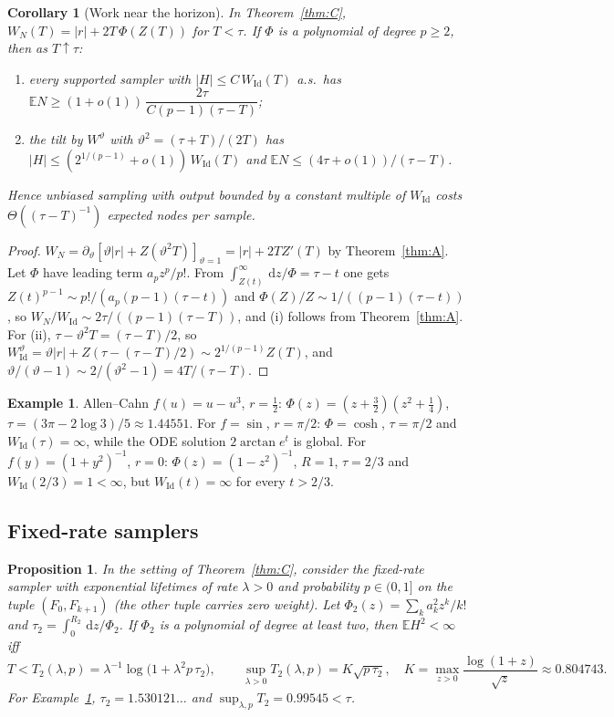\documentclass[11pt]{article}
\newtheorem{proposition}[theorem]{Proposition}
\newtheorem{corollary}[theorem]{Corollary}
\theoremstyle{definition}
\newtheorem{example}[theorem]{Example}
\theoremstyle{remark}
\newcommand{\E}{\mathbb{E}}
\newcommand{\Id}{\mathrm{Id}}
\newcommand{\dd}{\,\mathrm{d}}
\begin{document}
\begin{corollary}[Work near the horizon]\label{cor:work}
In Theorem~\ref{thm:C}, $W_N(T)=|r|+2T\,\Phi(Z(T))$ for $T<\tau$. If
$\Phi$ is a polynomial of degree $p\ge2$, then as $T\uparrow\tau$:
\begin{enumerate}[label=(\roman*),leftmargin=*]
\item every supported sampler with $|H|\le C\,W_\Id(T)$ a.s.\ has
$\E N\ge(1+o(1))\,\dfrac{2\tau}{C(p-1)(\tau-T)}$;
\item the tilt by $W^\vartheta$ with $\vartheta^2=(\tau+T)/(2T)$ has
$|H|\le(2^{1/(p-1)}+o(1))\,W_\Id(T)$ and $\E N\le(4\tau+o(1))/(\tau-T)$.
\end{enumerate}
Hence unbiased sampling with output bounded by a constant multiple of
$W_\Id$ costs $\Theta((\tau-T)^{-1})$ expected nodes per sample.
\end{corollary}
\begin{proof}
$W_N=\partial_\vartheta[\vartheta|r|+Z(\vartheta^2T)]_{\vartheta=1}
=|r|+2TZ'(T)$ by Theorem~\ref{thm:A}. Let $\Phi$ have leading term
$a_pz^p/p!$. From $\int_{Z(t)}^\infty\dd z/\Phi=\tau-t$ one gets
$Z(t)^{p-1}\sim p!/(a_p(p-1)(\tau-t))$ and
$\Phi(Z)/Z\sim1/((p-1)(\tau-t))$, so $W_N/W_\Id\sim2\tau/((p-1)(\tau-T))$,
and (i) follows from Theorem~\ref{thm:A}. For (ii),
$\tau-\vartheta^2T=(\tau-T)/2$, so $W^\vartheta_\Id=\vartheta|r|+
Z(\tau-(\tau-T)/2)\sim2^{1/(p-1)}Z(T)$, and
$\vartheta/(\vartheta-1)\sim2/(\vartheta^2-1)=4T/(\tau-T)$.
\end{proof}

\begin{example}\label{ex:ac}
Allen--Cahn $f(u)=u-u^3$, $r=\frac12$: $\Phi(z)=(z+\frac32)(z^2+\frac14)$,
$\tau=(3\pi-2\log3)/5\approx1.44551$. For $f=\sin$, $r=\pi/2$: $\Phi=\cosh$,
$\tau=\pi/2$ and $W_\Id(\tau)=\infty$, while the ODE solution
$2\arctan e^t$ is global. For $f(y)=(1+y^2)^{-1}$, $r=0$:
$\Phi(z)=(1-z^2)^{-1}$, $R=1$, $\tau=2/3$ and $W_\Id(2/3)=1<\infty$, but
$W_\Id(t)=\infty$ for every $t>2/3$.
\end{example}

\subsection{Fixed-rate samplers}

\begin{proposition}\label{prop:F}
In the setting of Theorem~\ref{thm:C}, consider the fixed-rate sampler
with exponential lifetimes of rate $\lambda>0$ and probability $p\in(0,1]$
on the tuple $(F_0,F_{k+1})$ (the other tuple carries zero weight). Let
$\Phi_2(z)=\sum_ka_k^2z^k/k!$ and $\tau_2=\int_0^{R_2}\dd z/\Phi_2$. If
$\Phi_2$ is a polynomial of degree at least two, then $\E H^2<\infty$ iff
\[
T<T_2(\lambda,p)=\lambda^{-1}\log\big(1+\lambda^2p\,\tau_2\big),
\qquad
\sup_{\lambda>0}T_2(\lambda,p)=K\sqrt{p\,\tau_2},\quad
K=\max_{z>0}\frac{\log(1+z)}{\sqrt z}\approx0.804743.
\]
For Example~\ref{ex:ac}, $\tau_2=1.530121\ldots$ and
$\sup_{\lambda,p}T_2=0.99545<\tau$.
\end{proposition}
\end{document}
